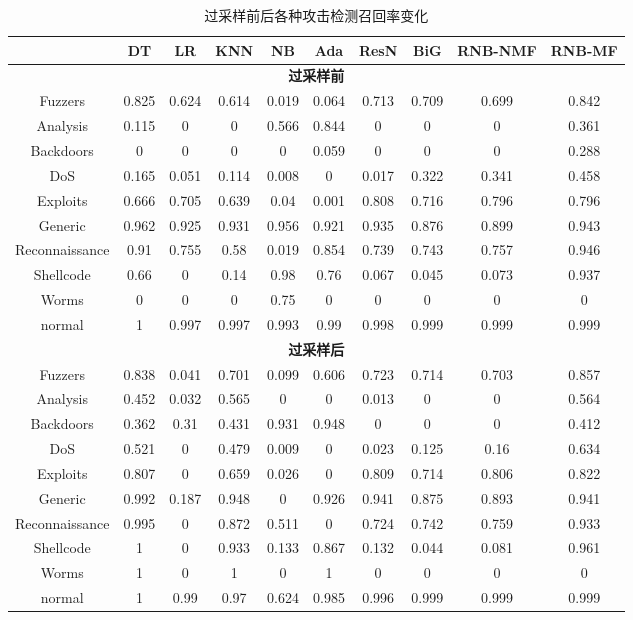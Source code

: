 \begin{table}[htbp]
  \centering
  \caption{过采样前后各种攻击检测召回率变化}
  \label{tab:model_performance_oversampling}
  \begin{tabular}{cccccccccc}
  \toprule
  & DT & LR & KNN & NB & Ada & ResN & BiG & RNB-NMF & RNB-MF \\
  \midrule
  \multicolumn{10}{c}{\textbf{过采样前}}\\
  Fuzzers & 0.825 & 0.624 & 0.614 & 0.019 & 0.064 & 0.713 & 0.709 & 0.699 & 0.842 \\
  Analysis & 0.115 & 0 & 0 & 0.566 & 0.844 & 0 & 0 & 0 & 0.361 \\
  Backdoors & 0 & 0 & 0 & 0 & 0.059 & 0 & 0 & 0 & 0.288 \\
  DoS & 0.165 & 0.051 & 0.114 & 0.008 & 0 & 0.017 & 0.322 & 0.341 & 0.458 \\
  Exploits & 0.666 & 0.705 & 0.639 & 0.04 & 0.001 & 0.808 & 0.716 & 0.796 & 0.796 \\
  Generic & 0.962 & 0.925 & 0.931 & 0.956 & 0.921 & 0.935 & 0.876 & 0.899 & 0.943 \\
  Reconnaissance & 0.91 & 0.755 & 0.58 & 0.019 & 0.854 & 0.739 & 0.743 & 0.757 & 0.946 \\
  Shellcode & 0.66 & 0 & 0.14 & 0.98 & 0.76 & 0.067 & 0.045 & 0.073 & 0.937 \\
  Worms & 0 & 0 & 0 & 0.75 & 0 & 0 & 0 & 0 & 0 \\
  normal & 1 & 0.997 & 0.997 & 0.993 & 0.99 & 0.998 & 0.999 & 0.999 & 0.999 \\
  \midrule
  \multicolumn{10}{c}{\textbf{过采样后}}\\
  Fuzzers & 0.838 & 0.041 & 0.701 & 0.099 & 0.606 & 0.723 & 0.714 & 0.703 & 0.857 \\
  Analysis & 0.452 & 0.032 & 0.565 & 0 & 0 & 0.013 & 0 & 0 & 0.564 \\
  Backdoors & 0.362 & 0.31 & 0.431 & 0.931 & 0.948 & 0 & 0 & 0 & 0.412 \\
  DoS & 0.521 & 0 & 0.479 & 0.009 & 0 & 0.023 & 0.125 & 0.16 & 0.634 \\
  Exploits & 0.807 & 0 & 0.659 & 0.026 & 0 & 0.809 & 0.714 & 0.806 & 0.822 \\
  Generic & 0.992 & 0.187 & 0.948 & 0 & 0.926 & 0.941 & 0.875 & 0.893 & 0.941 \\
  Reconnaissance & 0.995 & 0 & 0.872 & 0.511 & 0 & 0.724 & 0.742 & 0.759 & 0.933 \\
  Shellcode & 1 & 0 & 0.933 & 0.133 & 0.867 & 0.132 & 0.044 & 0.081 & 0.961 \\
  Worms & 1 & 0 & 1 & 0 & 1 & 0 & 0 & 0 & 0 \\
  normal & 1 & 0.99 & 0.97 & 0.624 & 0.985 & 0.996 & 0.999 & 0.999 & 0.999 \\
  \bottomrule
  \end{tabular}
\end{table}
  


